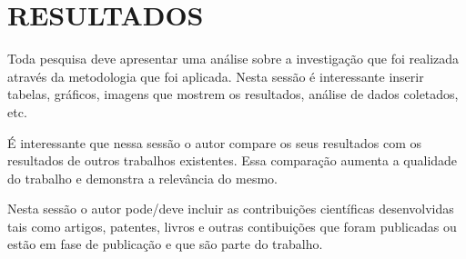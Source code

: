 \chapter{RESULTADOS}
Toda pesquisa deve apresentar uma análise sobre a investigação que foi realizada através da metodologia que foi aplicada. Nesta sessão é interessante inserir tabelas, gráficos, imagens que mostrem os resultados, análise de dados coletados, etc.

É interessante que nessa sessão o autor compare os seus resultados com os resultados de outros trabalhos existentes. Essa comparação aumenta a qualidade do trabalho e demonstra a relevância do mesmo. 

Nesta sessão o autor pode/deve incluir as contribuições científicas desenvolvidas tais como artigos, patentes, livros e outras contibuições que foram publicadas ou estão em fase de publicação e que são parte do trabalho.


